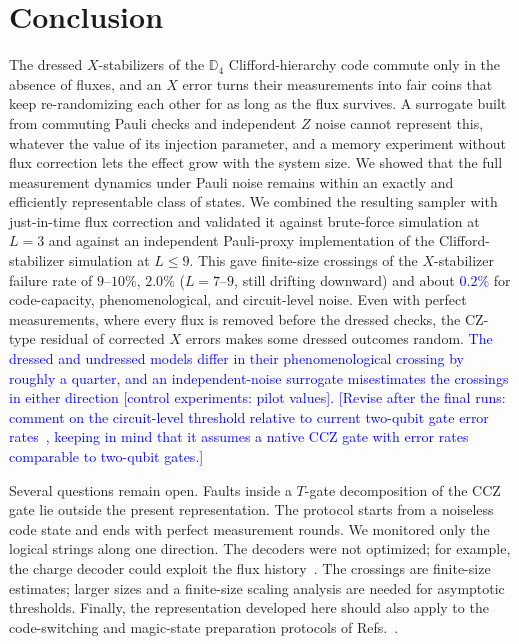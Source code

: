\documentclass[a4paper]{article}
\newcommand{\blue}[1]{\textcolor{blue}{#1}}
\begin{document}
\section{Conclusion}
\label{sec:conclusion}

The dressed $X$-stabilizers of the $\mathbb{D}_4$ Clifford-hierarchy code commute only in the absence of fluxes, and an $X$ error turns their measurements into fair coins that keep re-randomizing each other for as long as the flux survives. A surrogate built from commuting Pauli checks and independent $Z$ noise cannot represent this, whatever the value of its injection parameter, and a memory experiment without flux correction lets the effect grow with the system size. We showed that the full measurement dynamics under Pauli noise remains within an exactly and efficiently representable class of states. We combined the resulting sampler with just-in-time flux correction and validated it against brute-force simulation at $L=3$ and against an independent Pauli-proxy implementation of the Clifford-stabilizer simulation at $L\le9$. This gave finite-size crossings of the $X$-stabilizer failure rate of $9$--$10\%$, $2.0\%$ ($L=7$--$9$, still drifting downward) and about \blue{$0.2\%$} for code-capacity, phenomenological, and circuit-level noise. Even with perfect measurements, where every flux is removed before the dressed checks, the CZ-type residual of corrected $X$ errors makes some dressed outcomes random. \blue{The dressed and undressed models differ in their phenomenological crossing by roughly a quarter, and an independent-noise surrogate misestimates the crossings in either direction [control experiments: pilot values].} \blue{[Revise after the final runs: comment on the circuit-level threshold relative to current two-qubit gate error rates~\cite{Hughes2025}, keeping in mind that it assumes a native CCZ gate with error rates comparable to two-qubit gates.]}

Several questions remain open. Faults inside a $T$-gate decomposition of the CCZ gate lie outside the present representation. The protocol starts from a noiseless code state and ends with perfect measurement rounds. We monitored only the logical strings along one direction. The decoders were not optimized; for example, the charge decoder could exploit the flux history~\cite{magdalena2026}. The crossings are finite-size estimates; larger sizes and a finite-size scaling analysis are needed for asymptotic thresholds. Finally, the representation developed here should also apply to the code-switching and magic-state preparation protocols of Refs.~\cite{kobayashi2025clifford,davydova2025knots}.
\end{document}
